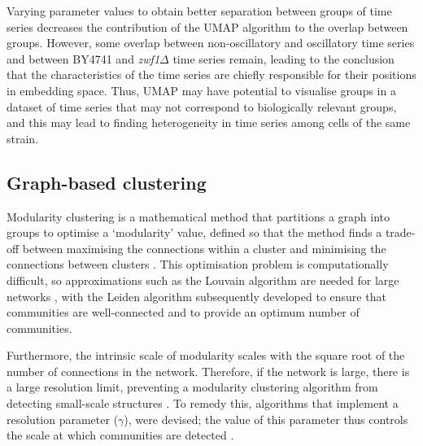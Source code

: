 Varying parameter values to obtain better separation between groups of time series decreases the contribution of the UMAP algorithm to the overlap between groups.
However, some overlap between non-oscillatory and oscillatory time series and between BY4741 and \textit{zwf1$\Delta$} time series remain, leading to the conclusion that the characteristics of the time series are chiefly responsible for their positions in embedding space.
Thus, UMAP may have potential to visualise groups in a dataset of time series that may not correspond to biologically relevant groups, and this may lead to finding heterogeneity in time series among cells of the same strain.


\subsection{Graph-based clustering}
\label{subsec:analysis-clustering-graphclustering}

Modularity clustering is a mathematical method that partitions a graph into groups to optimise a `modularity' value, defined so that the method finds a trade-off between maximising the connections within a cluster and minimising the connections between clusters \parencite{newmanModularityCommunityStructure2006}.
This optimisation problem is computationally difficult, so approximations such as the Louvain algorithm are needed for large networks \parencite{blondelFastUnfoldingCommunities2008}, with the Leiden algorithm \parencite{traagLouvainLeidenGuaranteeing2019} subsequently developed to ensure that communities are well-connected and to provide an optimum number of communities.

Furthermore, the intrinsic scale of modularity scales with the square root of the number of connections in the network.
Therefore, if the network is large, there is a large resolution limit, preventing a modularity clustering algorithm from detecting small-scale structures \parencite{fortunatoResolutionLimitCommunity2007,traagNarrowScopeResolutionlimitfree2011}.
To remedy this, algorithms that implement a resolution parameter ($\gamma$), were devised; the value of this parameter thus controls the scale at which communities are detected \parencite{reichardtDetectingFuzzyCommunity2004,kumpulaLimitedResolutionComplex2007}.


